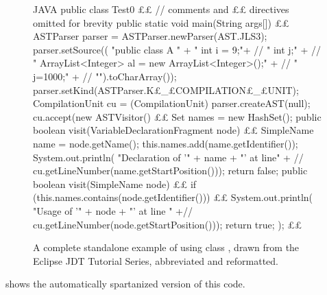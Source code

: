 \begin{figure}[hbtp]
  \caption{\label{figure:eclipse}%
    A complete standalone example of using class , drawn
    from the Eclipse JDT Tutorial Series, abbreviated and reformatted.}
    \begin{adjustbox}{max width=\columnwidth}
      \begin{code}[minipage, width=1.13\columnwidth]{JAVA}
public class Test0 {££ // comments and ££ directives omitted for brevity
  public static void main(String args[]) {££
    ASTParser parser = ASTParser.newParser(AST.JLS3);
    parser.setSource((
      "public class A {\n" +
      " int i = 9;\n"+ //
      " int j;\n" + //
      " ArrayList<Integer> al = new ArrayList<Integer>();\n" + //
      " j=1000;\n" + //
      "}\n").toCharArray());
    parser.setKind(ASTParser.K£\_£COMPILATION£\_£UNIT);
    CompilationUnit cu = (CompilationUnit) parser.createAST(null);
    cu.accept(new ASTVisitor() {££
      Set names = new HashSet();
      public boolean visit(VariableDeclarationFragment node) {££
        SimpleName name = node.getName();
        this.names.add(name.getIdentifier());
        System.out.println(
          "Declaration of '" + name + "' at line" + //
          cu.getLineNumber(name.getStartPosition()));
        return false;
      }
      public boolean visit(SimpleName node) {££
        if (this.names.contains(node.getIdentifier())) {££
          System.out.println(
            "Usage of '" + node + "' at line " +//
            cu.getLineNumber(node.getStartPosition()));
        }
        return true;
      }
    });
  }££
}
\end{code}
  \end{adjustbox}
\end{figure}

 shows the automatically spartanized version of
this code.

